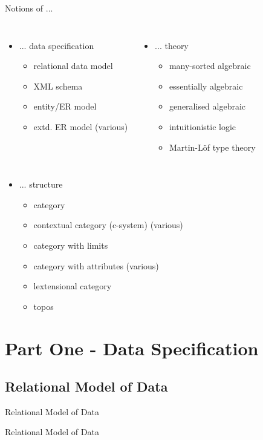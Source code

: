 \documentclass{beamer}
\renewcommand{\erpictureFolder}[0]{../SharedPictures}
\begin{document}
\begin{frame}{Notions of ...}
\begin{columns}[t]
\column{5.5cm}
\begin{itemize}
\item {... data specification
   \begin{itemize}
	    \item relational data model
			\item {\scriptsize XML} schema
			\item entity/{\scriptsize ER} model
			\item extd. {\scriptsize ER} model (various)
	 \end{itemize}
	}
	\end{itemize}
\column{5cm}
\begin{itemize}
	\item {... theory
   \begin{itemize}
	    \item many-sorted algebraic
			\item essentially algebraic
			\item generalised algebraic
			\item intuitionistic logic
			\item Martin-L\"of type theory
	 \end{itemize}
	}
	\end{itemize}
\end{columns}
\begin{itemize}
\item {... structure
   \begin{itemize}
	    \item category
			\item contextual category (c-system) (various)
			\item category with limits
			\item category with attributes (various)
			\item lextensional category
			\item topos
	 \end{itemize}
	}
\end{itemize}
\end{frame}

\section{Part One - Data Specification}
\subsection{Relational Model of Data}
\begin{frame}{Relational Model of Data}
\scalebox{0.6}{

}
\end{frame}
\begin{frame}{Relational Model of Data}
\scalebox{0.6}{

}
\end{frame}
\end{document}
